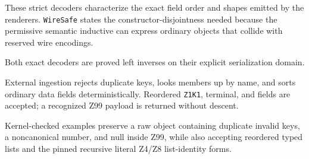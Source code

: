 \begin{definition}\label{def:wire-safe}
  \leanok
  These strict decoders characterize the exact field order and shapes emitted by the renderers.
  \texttt{WireSafe} states the constructor-disjointness needed because the permissive semantic
  inductive can express ordinary objects that collide with reserved wire encodings.
\end{definition}

\begin{lemma}\label{lem:wire-roundtrip}
  \leanok
  Both exact decoders are proved left inverses on their explicit serialization domain.
\end{lemma}

\begin{definition}\label{def:ingest}
  \leanok
  External ingestion rejects duplicate keys, looks members up by name, and sorts ordinary data
  fields deterministically.  Reordered \texttt{Z1K1}, terminal, and  fields are accepted;
  a recognized Z99 payload is returned without descent.
\end{definition}

\begin{lemma}\label{lem:quote-preserved}
  \leanok
  Kernel-checked examples preserve a raw object containing duplicate invalid keys, a noncanonical
  number, and null inside Z99, while also accepting reordered typed lists and the pinned recursive
  literal Z4/Z8 list-identity forms.
\end{lemma}

